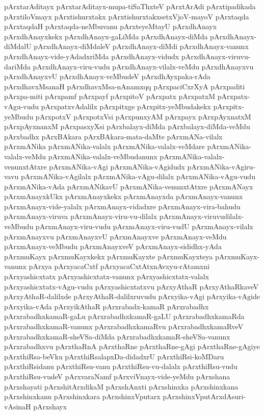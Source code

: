 {pArxtarAditayx
pArxtarAditayx-mupa-tiSaThxteV
pArxtArAdi
pArxtipadikada
pArxtiloVmayx
pArxtishurxtakx
pArxtishurxtakxsetxVjoV-mayoV
pArxtaqda
pArxtaqdaH
pArxtaqda-neMbuvanu
pArxteyeMtayU
pArxdhAnayx
pArxdhAnayxkekx
pArxdhAnayx-gaLiMda
pArxdhAnayx-diMda
pArxdhAnayx-diMdalU
pArxdhAnayx-diMdaleV
pArxdhAnayx-diMdi
pArxdhAnayx-vanunx
pArxdhAnayx-vide-yAdadxriMda
pArxdhAnayx-vidudx
pArxdhAnayx-viruvu-dariMda
pArxdhAnayx-viru-vudu
pArxdhAnayx-vilalx-veMdu
pArxdhAnayxvu
pArxdhAnayxvU
pArxdhAnayx-veMbudeV
pArxdhAyxpaka-rAda
pArxdhavxMsanaH
pArxdhavxMsa-nAnamxqq
pArxpaciCxrXyA
pArxpaditi
pArxpa-miti
pArxpamf
pArxpayf
pArxpitoV
pArxpatx
pArxpatxM
pArxpatx-vAgu-vudu
pArxpatxvAdalilx
pArxpitxge
pArxpitx-yeMbudakekx
pArxpitx-yeMbudu
pArxpotxV
pArxpotxVsi
pArxpunxyAM
pArxpayx
pArxpAyxnatxM
pArxpAyxnanxM
pArxpasxyXsi
pArxbalayx-diMda
pArxbalayx-diMda-veMdu
pArxbadhx
pArxBAkara
pArxBAkara-mata-daMte
pArxmANa-vilalx
pArxmANika
pArxmANika-valalx
pArxmANika-valalx-veMdare
pArxmANika-valalx-veMdu
pArxmANika-valalx-veMbudanunx
pArxmANika-valalx-venunxtAtxre
pArxmANika-vAgi
pArxmANika-vAgidudx
pArxmANika-vAgiru-vavu
pArxmANika-vAgilalx
pArxmANika-vAgu-dilalx
pArxmANika-vAgu-vudu
pArxmANika-vAda
pArxmANikavU
pArxmANika-venunxtAtxre
pArxmANayx
pArxmAnayxkUkx
pArxmAnayxkekx
pArxmAnayxda
pArxmAnayx-vanunx
pArxmAnayx-vide-yalalx
pArxmAnayx-vidadxre
pArxmAnayx-vira-bahudu
pArxmAnayx-viruva
pArxmAnayx-viru-vu-dilalx
pArxmAnayx-viruvudilalx-veMbudu
pArxmAnayx-viru-vudu
pArxmAnayx-viru-vudU
pArxmAnayx-vilalx
pArxmAnayxvu
pArxmAnayxvU
pArxmAnayxve
pArxmAnayx-veMdu
pArxmAnayx-veMbudu
pArxmAnayxveV
pArxmAnayx-sididhx-yAda
pArxmuKayx
pArxmuKayxkekx
pArxmuKayxte
pArxmuKayxteya
pArxmuKayx-vanunx
pArxya
pArxyacaCxtf
pArxyacaCxtAtxnAvxyu-rAtamxni
pArxyashicxtatx
pArxyashicxtatx-vanunx
pArxyashicxtatx-valalx
pArxyashicxtatx-vAgu-vudu
pArxyashicxtatxvu
pArxyAthaR
pArxyAthaRkaveV
pArxyAthaR-dalilxde
pArxyAthaR-dalilxruvudu
pArxyika-vAgi
pArxyika-vAgide
pArxyika-vAda
pArxyikAthaR
pArxrabadx-kamaR
pArxrabadhx
pArxrabadhxkamaR-gaLu
pArxrabadhxkamaR-gaLU
pArxrabadhxkamaRda
pArxrabadhxkamaR-vanunx
pArxrabadhxkamaRvu
pArxrabadhxkamaRveV
pArxrabadhxkamaR-sheVSa-diMda
pArxrabadhxkamaR-sheVSa-vanunx
pArxrabadhxvu
pArxthaRnA
pArxthaRne
pArxthaRne-gAgi
pArxthaRne-gAgiye
pArxthiRsa-beVku
pArxthiRsalapxDa-didadxrU
pArxthiRsi-koMDaru
pArxthiRsidanu
pArxthiRsu-vanu
pArxthiRsu-vu-dalalx
pArxthiRsu-vudu
pArxthiRsu-vudeV
pArxvaraNamf
pArxviVnayx-vide-yeMdu
pArxshana
pArxshayati
pArxshitArxdikaM
pArxshAnxti
pArxshinxka
pArxshinxkana
pArxshinxkanu
pArxshinxkara
pArxshinxVputarx
pArxshinxVputArxdAsuri-vAsinaH
pArxshayx
}
